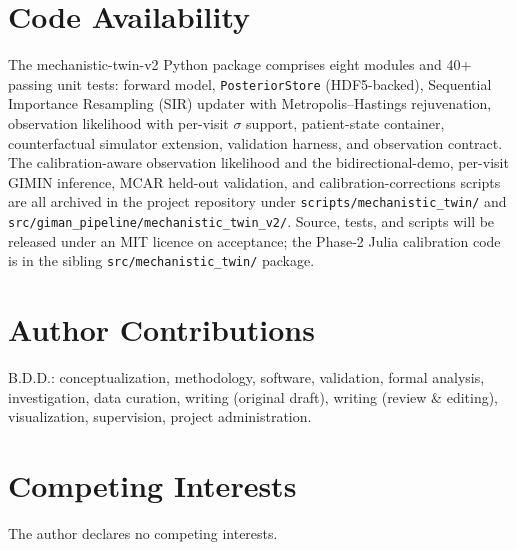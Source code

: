 \section{Code Availability}

The mechanistic-twin-v2 Python package comprises eight modules and 40+ passing unit tests: forward model, \texttt{PosteriorStore} (HDF5-backed), Sequential Importance Resampling (SIR) updater with Metropolis--Hastings rejuvenation, observation likelihood with per-visit $\sigma$ support, patient-state container, counterfactual simulator extension, validation harness, and observation contract. The calibration-aware observation likelihood and the bidirectional-demo, per-visit GIMIN inference, MCAR held-out validation, and calibration-corrections scripts are all archived in the project repository under \texttt{scripts/mechanistic\_twin/} and \texttt{src/giman\_pipeline/mechanistic\_twin\_v2/}. Source, tests, and scripts will be released under an MIT licence on acceptance; the Phase-2 Julia calibration code is in the sibling \texttt{src/mechanistic\_twin/} package.

\section{Author Contributions}

B.D.D.: conceptualization, methodology, software, validation, formal analysis, investigation, data curation, writing (original draft), writing (review \& editing), visualization, supervision, project administration.

\section{Competing Interests}

The author declares no competing interests.
